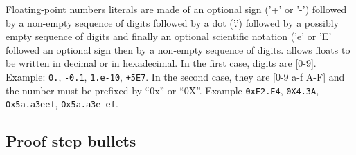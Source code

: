 {%

Floating-point numbers literals are made of an optional sign ('+' or
'-') followed by a non-empty sequence of digits followed by a dot
('.') followed by a possibly empty sequence of digits and finally an
optional scientific notation ('e' or 'E' followed an optional sign
then by a non-empty sequence of digits. {\focal} allows floats to be
written in decimal or in hexadecimal. In the first case, digits are
[0-9]. Example: {\tt 0.}, {\tt -0.1}, {\tt 1.e-10}, {\tt +5E7}.
In the second case, they are [0-9 a-f A-F] and the number must be
prefixed by ``0x'' or ``0X''. Example {\tt 0xF2.E4}, {\tt 0X4.3A},
{\tt Ox5a.a3eef}, {\tt Ox5a.a3e-ef}.

\subsection{Proof step bullets}
\begin{syn}
 \is
  \tok{<}  \tok{>}
\end{syn}

}
